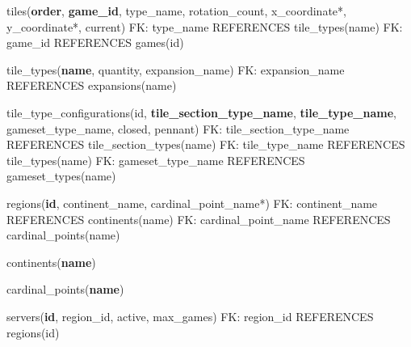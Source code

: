 tiles(\textbf{order}, \textbf{game\_id}, type\_name, rotation\_count, x\_coordinate*, y\_coordinate*, current)\newline
FK: type\_name REFERENCES tile\_types(name)\newline
FK: game\_id REFERENCES games(id)\newline

tile\_types(\textbf{name}, quantity, expansion\_name)\newline
FK: expansion\_name REFERENCES expansions(name)\newline

tile\_type\_configurations(id, \textbf{tile\_section\_type\_name}, \textbf{tile\_type\_name}, gameset\_type\_name, closed, pennant)\newline
FK: tile\_section\_type\_name REFERENCES tile\_section\_types(name)\newline
FK: tile\_type\_name REFERENCES tile\_types(name)\newline
FK: gameset\_type\_name REFERENCES gameset\_types(name)\newline

regions(\textbf{id}, continent\_name, cardinal\_point\_name*)\newline
FK: continent\_name REFERENCES continents(name)\newline
FK: cardinal\_point\_name REFERENCES cardinal\_points(name)\newline

continents(\textbf{name})\newline

cardinal\_points(\textbf{name})\newline

servers(\textbf{id}, region\_id, active, max\_games)\newline
FK: region\_id REFERENCES regions(id)

